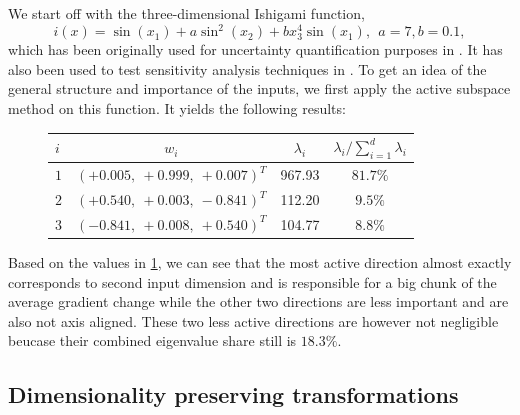\documentclass[
  a4paper,  %
  twoside,  %
  bibliography=totoc,
  headsepline,
  cleardoublepage=empty,
  parskip=half,
  draft=false
]{scrbook}
\begin{document}
We start off with the three-dimensional Ishigami function,
\begin{equation}
i(x)=\sin(x_1) + a \sin^2(x_2) + b x_3^4 \sin(x_1), ~~ a = 7, b=0.1,
\end{equation}
%
which has been originally used for uncertainty quantification purposes in \cite{Ishigami1990AnIQ}.
It has also been used to test sensitivity analysis techniques in \cite{Sobol1999}.
To get an idea of the general structure and importance of the inputs, we first apply the active subspace method on this function. It yields the following results:
\begin{mdframed}[style=style]
\begin{figure}[H]
\centering

\bgroup
\def\arraystretch{1.2}%
  \begin{tabular}{ l | c c c}
$i$ & $w_i$ & $\lambda_i$ & $\lambda_i / \sum_{i=1}^d \lambda_i$\\
\hline
$1$ & $(+0.005, ~+0.999, ~+0.007)^T$ & 967.93 & $81.7\%$\\
$2$  & $(+0.540, ~+0.003, ~-0.841)^T$ & 112.20 & $9.5\%$\\
$3$ & $(-0.841, ~+0.008, ~+0.540)^T$ & 104.77 & $8.8\%$\\
\end{tabular}
\egroup
\vspace{0.5em}

\delimit

\label{tab:ishigami_as}
\end{figure}
\end{mdframed}
%
Based on the values in \cref{tab:ishigami_as}, we can see that the most active direction almost exactly corresponds to second input dimension and is responsible for a big chunk of the average gradient change while the other two directions are less important and are also not axis aligned.
These two less active directions are however not negligible beucase their combined eigenvalue share still is $18.3\%$.

\subsection{Dimensionality preserving transformations}
\end{document}
